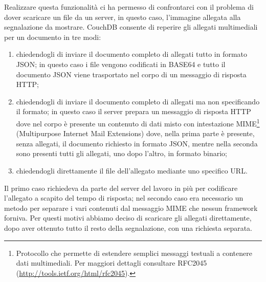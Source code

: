             Realizzare questa funzionalità ci ha permesso di confrontarci con il
            problema di dover scaricare un file da un server, in questo caso,
            l'immagine allegata alla segnalazione da mostrare. CouchDB
            consente di reperire gli allegati multimediali per un documento in
            tre modi:
            \begin{enumerate}
                \item chiedendogli di inviare il documento completo di allegati
                tutto in formato JSON; in questo caso i file vengono codificati
                in BASE64 e tutto il documento JSON viene trasportato nel corpo
                di un messaggio di risposta HTTP;
                \item chiedendogli di inviare il documento completo di allegati
                ma non specificando il formato; in questo caso il server prepara
                un messaggio di risposta HTTP dove nel corpo è presente un
                contenuto di dati misto con intestazione
                MIME\footnote{Protocollo che permette di estendere semplici
                messaggi testuali a contenere dati multimediali. Per maggiori
                dettagli consultare RFC2045
                (\url{http://tools.ietf.org/html/rfc2045}).} (Multipurpose
                Internet Mail Extensions) dove, nella prima parte è presente,
                senza allegati, il documento richiesto in formato JSON, mentre
                nella seconda sono presenti tutti gli allegati, uno dopo
                l'altro, in formato binario;
                \item chiedendogli direttamente il file dell'allegato mediante
                uno specifico URL.
            \end{enumerate}
            Il primo caso richiedeva da parte del server del lavoro in più per
            codificare l'allegato a scapito del tempo di risposta; nel secondo
            caso era necessario un metodo per separare i vari contenuti dal
            messaggio MIME che nessun framework forniva. Per questi motivi
            abbiamo deciso di scaricare gli allegati direttamente, dopo aver
            ottenuto tutto il resto della segnalazione, con una richiesta
            separata.

